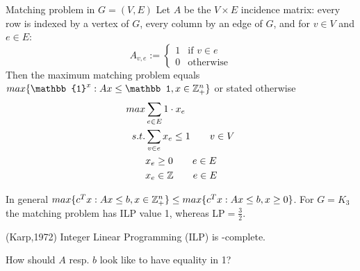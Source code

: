 \begin{xmp+}Matching problem in $G=(V,E)$
Let $A$ be the $V\times E$ incidence matrix: every row is indexed by a vertex of $G$, every column by an edge of $G$, and for $v \in V$ and $ e \in E$:\\
\[A_{v,e}:=\begin{cases} 1 & \text{if } v \in e \\
					0 & \text{otherwise}
		\end{cases}
\]
Then the maximum matching problem equals $max\{\mathbb{1}^x: Ax \leq \mathbb1, x\in \Z_+^n\}$ or stated otherwise
\begin{align*} 
	max & \sum\limits_{e \in E} 1\cdot x_e \\
	s.t. &\sum\limits_{v \in e} x_e \leq 1 \qquad v \in V \\
	&x_e \geq 0 \qquad e \in E \\
	&x_e \in \mathbb{Z} \qquad e  \in E
\end{align*}

In general $max\{c^Tx:Ax \leq b, x \in \mathbb{Z}_+^n\} \leq max \{c^Tx: Ax \leq b, x\geq 0\}$. For $G=K_3$ the matching problem has ILP value 1, whereas LP$=\frac32$.
\end{xmp+}
\begin{thm}(Karp,1972)
Integer Linear Programming (ILP) is \npoly-complete.
\end{thm}

\begin{qstn}
How should $A$ resp. $b$ look like to have equality in 1?
\end{qstn}